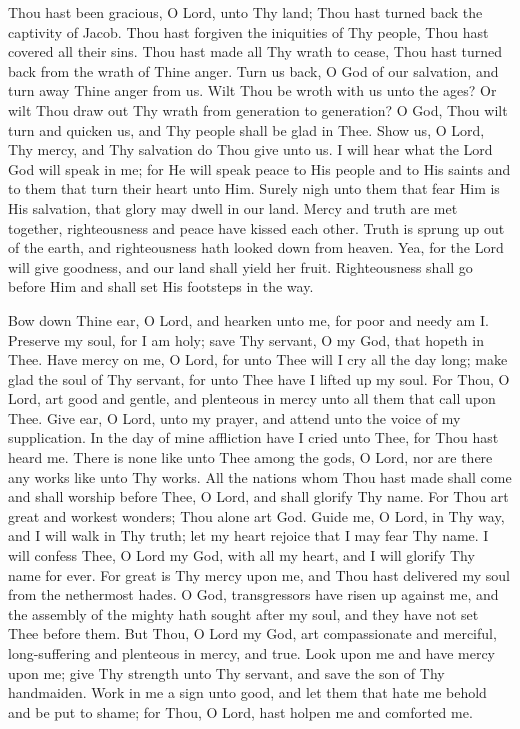 {
Thou hast been gracious, O Lord, unto Thy land;
Thou hast turned back the captivity of 
Jacob. 
Thou hast forgiven the iniquities of Thy people,
Thou hast covered all their sins. 
Thou hast made all Thy wrath to cease,
Thou hast turned back from the wrath of Thine 
anger. 
Turn us back, O God of our salvation, and turn away Thine anger from us. 
Wilt Thou be wroth with us unto the ages? Or wilt Thou draw out Thy wrath from 
generation to generation? 
O God, Thou wilt turn and quicken us, and Thy people shall be glad in Thee. 
Show us, O Lord, Thy mercy, and Thy salvation do Thou give unto us. 
I will hear what the Lord God will speak in me;
for He will speak peace to His people 
and to His saints and to them that turn their heart unto Him. 
Surely nigh unto them that fear Him is His salvation,
that glory may dwell in our land. 
Mercy and truth are met together,
righteousness and peace have kissed each other. 
Truth is sprung up out of the earth,
and righteousness hath looked down from heaven. 
Yea, for the Lord will give goodness, and our land shall yield her fruit. 
Righteousness shall go before Him and shall set His footsteps in the way. 

Bow down Thine ear, O Lord, and hearken unto me, for poor and needy am I. 
Preserve my soul, for I am holy;
save Thy servant, O my God, that hopeth in Thee. 
Have mercy on me, O Lord, for unto Thee will I cry all the day long;
make glad the soul 
of Thy servant, for unto Thee have I lifted up my soul. 
For Thou, O Lord, art good and gentle,
and plenteous in mercy unto all them that call 
upon Thee. 
Give ear, O Lord, unto my prayer,
and attend unto the voice of my supplication. 
In the day of mine affliction have I cried unto Thee, for Thou hast heard me. 
There is none like unto Thee among the gods, O Lord,
nor are there any works like unto 
Thy works. 
All the nations whom Thou hast made shall come and shall worship before Thee,
O Lord, 
and shall glorify Thy name. 
For Thou art great and workest wonders; Thou alone art God. 
Guide me, O Lord, in Thy way, and I will walk in Thy truth;
let my heart rejoice that I 
may fear Thy name. 
I will confess Thee, O Lord my God, with all my heart,
and I will glorify Thy name for ever. 
For great is Thy mercy upon me,
and Thou hast delivered my soul from the nethermost hades. 
O God, transgressors have risen up against me,
and the assembly of the mighty hath 
sought after my soul, and they have not set Thee before them. 
But Thou, O Lord my God, art compassionate and merciful,
long-suffering and plenteous in mercy, and true. 
Look upon me and have mercy upon me;
give Thy strength unto Thy servant, and save the son of Thy handmaiden. 
Work in me a sign unto good,
and let them that hate me behold and be put to shame;
for Thou, O Lord, hast holpen me and comforted me. 

}
